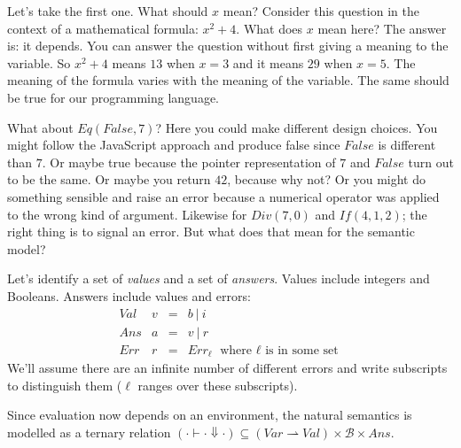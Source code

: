 \documentclass[11pt]{article}
\newcommand\mval{v}
\newcommand\mans{a}
\newcommand\mint{i}
\newcommand\mbool{b}
\newcommand\merr{r}
\newcommand\Err{\mathit{Err}}
\newcommand\Eq{\mathit{Eq}}
\newcommand\False{\mathit{False}}
\newcommand\If{\mathit{If}}
\newcommand\Div{\mathit{Div}}
\newcommand\Barith{\mathcal{B}}
\newcommand\s[1]{\mathit{#1}}
\begin{document}
Let's take the first one.  What should $\s{x}$ mean?  Consider this
question in the context of a mathematical formula: $x^2+4$.  What does
$x$ mean here?  The answer is: it depends.  You can answer the
question without first giving a meaning to the variable.  So $x^2+4$
means $13$ when $x=3$ and it means $29$ when $x=5$.  The meaning of
the formula varies with the meaning of the variable.  The same should
be true for our programming language.

What about $\Eq(\False,7)$?  Here you could make different design
choices.  You might follow the JavaScript approach and produce false
since $\False$ is different than $7$.  Or maybe true because the
pointer representation of $7$ and $\False$ turn out to be the same.
Or maybe you return $42$, because why not?  Or you might do something
sensible and raise an error because a numerical operator was applied
to the wrong kind of argument.  Likewise for $\Div(7,0)$ and
$\If(4,1,2)$; the right thing is to signal an error.  But what does
that mean for the semantic model?

Let's identify a set of \emph{values} and a set of \emph{answers}.
Values include integers and Booleans.  Answers include values and
errors:
\[
\begin{array}{llcl}
\mathit{Val} & \mval & = & \mbool\ |\ \mint\\
\mathit{Ans} & \mans & = & \mval\ |\ \merr\\
\mathit{Err} & \merr & = & \Err_\ell \text{ where $\ell$ is in some set}
\end{array}
\]
We'll assume there are an infinite number of different errors and
write subscripts to distinguish them ($\ell$ ranges over these subscripts).


Since evaluation now depends on an environment, the natural semantics
is modelled as a ternary relation $(\cdot \vdash \cdot \Downarrow
\cdot) \subseteq (\mathit{Var} \rightharpoonup \mathit{Val})\times \Barith \times \mathit{Ans}$.
\end{document}
